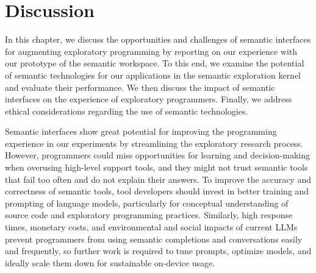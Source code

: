 
\chapter{Discussion}
\label{cha:discussion}

In this chapter, we discuss the opportunities and challenges of semantic interfaces for augmenting exploratory programming by reporting on our experience with our prototype of the semantic workspace.
To this end, we examine the potential of semantic technologies for our applications in the semantic exploration kernel and evaluate their performance.
We then discuss the impact of semantic interfaces on the experience of exploratory programmers.
Finally, we address ethical considerations regarding the use of semantic technologies.


\begin{summary}
	Semantic interfaces show great potential for improving the programming experience in our experiments by streamlining the exploratory research process.
	However, programmers could miss opportunities for learning and decision-making when overusing high-level support tools, and they might not trust semantic tools that fail too often and do not explain their answers.
	To improve the accuracy and correctness of semantic tools, tool developers should invest in better training and prompting of language models, particularly for conceptual understanding of source code and exploratory programming practices.
	Similarly, high response times, monetary costs, and environmental and social impacts of current LLMs prevent programmers from using semantic completions and conversations easily and frequently, so further work is required to tune prompts, optimize models, and ideally scale them down for sustainable on-device usage.
\end{summary}
